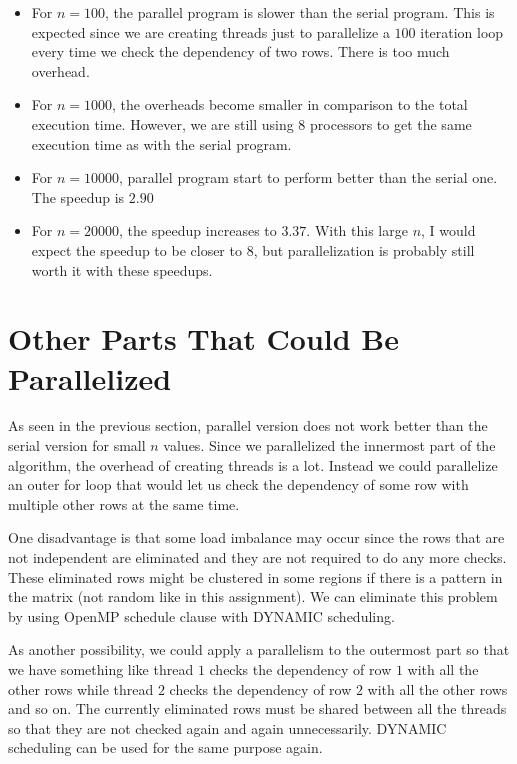 \documentclass{article}
\begin{document}
\begin{itemize}
    \item For $n=100$, the parallel program is slower than the serial program. This is expected since we are creating threads just to parallelize a $100$ iteration loop every time we check the dependency of two rows. There is too much overhead.
    \item For $n=1000$, the overheads become smaller in comparison to the total execution time. However, we are still using 8 processors to get the same execution time as with the serial program.
    \item For $n=10000$, parallel program start to perform better than the serial one. The speedup is $2.90$
    \item For $n=20000$, the speedup increases to $3.37$. With this large $n$, I would expect the speedup to be closer to $8$, but parallelization is probably still worth it with these speedups.
\end{itemize}

\section{Other Parts That Could Be Parallelized}

As seen in the previous section, parallel version does not work better than the serial version for small $n$ values. Since we parallelized the innermost part of the algorithm, the overhead of creating threads is a lot. Instead we could parallelize an outer for loop that would let us check the dependency of some row with multiple other rows at the same time. 

One disadvantage is that some load imbalance may occur since the rows that are not independent are eliminated and they are not required to do any more checks. These eliminated rows might be clustered in some regions if there is a pattern in the matrix (not random like in this assignment). We can eliminate this problem by using OpenMP schedule clause with DYNAMIC scheduling. 

As another possibility, we could apply a parallelism to the outermost part so that we have something like thread $1$ checks the dependency of row $1$ with all the other rows while thread $2$ checks the dependency of row $2$ with all the other rows and so on. The currently eliminated rows must be shared between all the threads so that they are not checked again and again unnecessarily. DYNAMIC scheduling can be used for the same purpose again.
\end{document}
